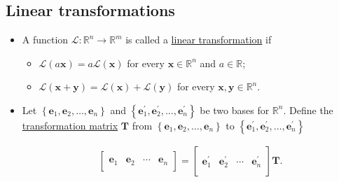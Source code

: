 \documentclass[12pt,thmsa]{article}
\begin{document}
\subsection{Linear transformations}

\begin{itemize}
	\item A function \(\mathcal{L}: \mathbb{R}^{n} \rightarrow \mathbb{R}^{m}\) is called a \underline{linear transformation} if
	
	\begin{itemize}
		\item \(\mathcal{L}(a \boldsymbol{x})=a \mathcal{L}(\boldsymbol{x})\) for every \(\boldsymbol{x} \in \mathbb{R}^{n}\) and \(a \in \mathbb{R}\);
		\item \(\mathcal{L}(\boldsymbol{x}+\boldsymbol{y})=\mathcal{L}(\boldsymbol{x})+\mathcal{L}(\boldsymbol{y})\) for every \(\boldsymbol{x}, \boldsymbol{y} \in \mathbb{R}^{n}. \)
		
	\end{itemize}

	\item Let \(\left\{\boldsymbol{e}_{1}, \boldsymbol{e}_{2}, \ldots, \boldsymbol{e}_{n}\right\}\) and \(\left\{\boldsymbol{e}_{1}^{\prime}, \boldsymbol{e}_{2}^{\prime}, \ldots, \boldsymbol{e}_{n}^{\prime}\right\}\) be two bases for \(\mathbb{R}^{n}\). Define the \underline{transformation matrix} \(\boldsymbol{T}\) from \(\left\{\boldsymbol{e}_{1}, \boldsymbol{e}_{2}, \ldots, \boldsymbol{e}_{n}\right\}\) to  \(\left\{\boldsymbol{e}_{1}^{\prime}, \boldsymbol{e}_{2}^{\prime}, \ldots, \boldsymbol{e}_{n}^{\prime}\right\}\)
	
	\begin{equation*}
		\begin{gathered}
			{\left[ \begin{array}{cccc}
					 &  &   &  \\
					\boldsymbol{e}_1 & \boldsymbol{e}_2 & \cdots & \boldsymbol{e}_n \\
					 &  &  & 
				\end{array} \right] =
			\left[ \begin{array}{cccc}
				 &  &   &  \\
				\boldsymbol{e}_1^{\prime} & \boldsymbol{e}_2^{\prime} & \cdots & \boldsymbol{e}_n^{\prime} \\
				 &  &   &
			\end{array} \right] \boldsymbol{T}}.
		\end{gathered}
	\end{equation*}


\end{itemize}
\end{document}
